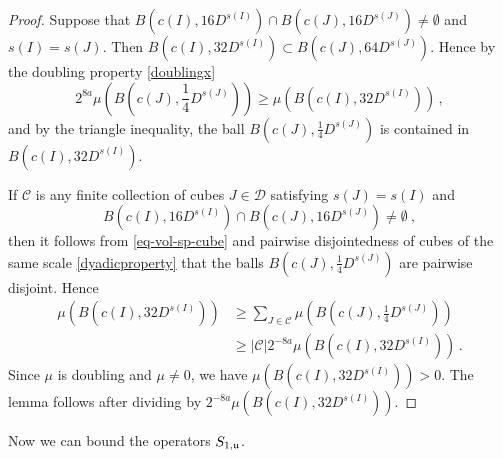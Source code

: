 {\begin{proof}
    Suppose that $B(c(I), 16 D^{s(I)}) \cap B(c(J), 16 D^{s(J)}) \ne \emptyset$ and $s(I) = s(J)$. Then $B(c(I), 32 D^{s(I)}) \subset B(c(J), 64 D^{s(J)})$. Hence by the doubling property \eqref{doublingx}
    $$
        2^{8a}\mu(B(c(J), \frac{1}{4}D^{s(J)})) \ge \mu(B(c(I), 32 D^{s(I)}))\,,
    $$
    and by the triangle inequality, the ball $B(c(J), \frac{1}{4}D^{s(J)})$ is contained in $B(c(I), 32 D^{s(I)})$.

    If $\mathcal{C}$ is any finite collection of cubes $J \in \mathcal{D}$ satisfying $s(J) = s(I)$ and
    \begin{equation*}
        B(c(I), 16 D^{s(I)}) \cap B(c(J), 16 D^{s(J)}) \ne\emptyset\ ,
    \end{equation*} then it follows from \eqref{eq-vol-sp-cube} and pairwise disjointedness of cubes of the same scale \eqref{dyadicproperty} that the balls $B(c(J), \frac{1}{4} D^{s(J)})$ are pairwise disjoint. Hence
    \begin{align*}
        \mu(B(c(I), 32 D^{s(I)})) &\ge \sum_{J \in \mathcal{C}} \mu(B(c(J), \frac{1}{4}D^{s(J)}))\\
        &\ge |\mathcal{C}| 2^{-8a} \mu(B(c(I), 32 D^{s(I)}))\,.
    \end{align*}
    Since $\mu$ is doubling and $\mu \ne 0$, we have $\mu(B(c(I), 32D^{s(I)})) > 0$. The lemma follows after dividing by $2^{-8a}\mu(B(c(I), 32D^{s(I)}))$.
\end{proof}

Now we can bound the operators $S_{1, {\mathfrak u}}$.

}
